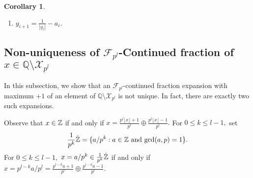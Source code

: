 \documentclass[12pt]{elsarticle}
\newtheorem{corollary}[theorem]{Corollary}
\theoremstyle{definition}
\newtheorem{example}{Example}
\newcommand{\field}[1]{\mathbb{#1}}          \newcommand{\Q}{\field{Q}}
\newcommand{\N}{\field{N}}
\newcommand{\mX}{{\mathcal X}}
\newcommand{\f}{{\mathcal F}}
\newcommand{\ep}{\epsilon}
\begin{document}
{\begin{corollary}
\begin{enumerate}
\begin{enumerate}
 		
 			\item Suppose $1/|y_i|\not\in\N$ then 
 			$$a_i=\left\{ \begin{array}{lr}
 			\lfloor (\frac{1}{|y_i|})\rfloor, & 	\textnormal{if } \lfloor (\frac{1}{|y_i|})\rfloor\not\equiv -\ep_i p_{i-2}p_{i-1}^{-1}\mod p\\\\
 			\lfloor (\frac{1}{|y_i|}+1)\rfloor, & \textnormal{otherwise}.
 			\end{array}\right.$$
 			
 		\end{enumerate}
 		
 		\item    $y_{i+1}=\frac{1}{|y_i|}-a_i$. 
 	\end{enumerate}
 	\end{corollary}
 	\subsection{Non-uniqueness of $\f_{p^l}$-Continued fraction of $x\in\Q\setminus\mX_{p^l}$}
 In this subsection, we show that an $\f_{p^l}$-continued fraction expansion with maximum $+1$ of an element of $\Q\setminus\mX_{p^l}$  is not unique. In fact,  there are exactly two such expansions.
 	
  Observe that 
  	$x\in\Z$ if and only if $x=\frac{p^l\lfloor{x}\rfloor+1}{p^l}\oplus \frac{p^l\lfloor{x}\rfloor-1}{p^l}.$ For $0\le k\le l-1,$ set $$\frac{1}{p^k}\dot{\Z}=\{a/p^{k}: a\in\Z \textnormal{ and } \mathrm{gcd}(a,p)=1\}.$$ 
  	For $0\le k\le l-1,$
  		$x=a/p^k\in\frac{1}{p^k}\dot{\Z}$ if and only if $x=p^{l-k}a/p^l=\frac{p^{l-k}a+1}{p^l}\oplus \frac{p^{l-k}a-1}{p^l}.$	
  		
}
\end{document}
